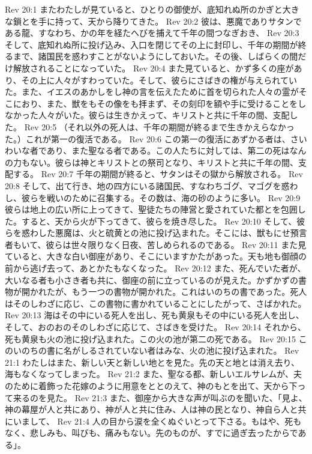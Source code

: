 Rev 20:1  またわたしが見ていると、ひとりの御使が、底知れぬ所のかぎと大きな鎖とを手に持って、天から降りてきた。
Rev 20:2  彼は、悪魔でありサタンである龍、すなわち、かの年を経たへびを捕えて千年の間つなぎおき、
Rev 20:3  そして、底知れぬ所に投げ込み、入口を閉じてその上に封印し、千年の期間が終るまで、諸国民を惑わすことがないようにしておいた。その後、しばらくの間だけ解放されることになっていた。
Rev 20:4  また見ていると、かず多くの座があり、その上に人々がすわっていた。そして、彼らにさばきの権が与えられていた。また、イエスのあかしをし神の言を伝えたために首を切られた人々の霊がそこにおり、また、獣をもその像をも拝まず、その刻印を額や手に受けることをしなかった人々がいた。彼らは生きかえって、キリストと共に千年の間、支配した。
Rev 20:5  （それ以外の死人は、千年の期間が終るまで生きかえらなかった。）これが第一の復活である。
Rev 20:6  この第一の復活にあずかる者は、さいわいな者であり、また聖なる者である。この人たちに対しては、第二の死はなんの力もない。彼らは神とキリストとの祭司となり、キリストと共に千年の間、支配する。
Rev 20:7  千年の期間が終ると、サタンはその獄から解放される。
Rev 20:8  そして、出て行き、地の四方にいる諸国民、すなわちゴグ、マゴグを惑わし、彼らを戦いのために召集する。その数は、海の砂のように多い。
Rev 20:9  彼らは地上の広い所に上ってきて、聖徒たちの陣営と愛されていた都とを包囲した。すると、天から火が下ってきて、彼らを焼き尽した。
Rev 20:10  そして、彼らを惑わした悪魔は、火と硫黄との池に投げ込まれた。そこには、獣もにせ預言者もいて、彼らは世々限りなく日夜、苦しめられるのである。
Rev 20:11  また見ていると、大きな白い御座があり、そこにいますかたがあった。天も地も御顔の前から逃げ去って、あとかたもなくなった。
Rev 20:12  また、死んでいた者が、大いなる者も小さき者も共に、御座の前に立っているのが見えた。かずかずの書物が開かれたが、もう一つの書物が開かれた。これはいのちの書であった。死人はそのしわざに応じ、この書物に書かれていることにしたがって、さばかれた。
Rev 20:13  海はその中にいる死人を出し、死も黄泉もその中にいる死人を出し、そして、おのおのそのしわざに応じて、さばきを受けた。
Rev 20:14  それから、死も黄泉も火の池に投げ込まれた。この火の池が第二の死である。
Rev 20:15  このいのちの書に名がしるされていない者はみな、火の池に投げ込まれた。
Rev 21:1  わたしはまた、新しい天と新しい地とを見た。先の天と地とは消え去り、海もなくなってしまった。
Rev 21:2  また、聖なる都、新しいエルサレムが、夫のために着飾った花嫁のように用意をととのえて、神のもとを出て、天から下って来るのを見た。
Rev 21:3  また、御座から大きな声が叫ぶのを聞いた、「見よ、神の幕屋が人と共にあり、神が人と共に住み、人は神の民となり、神自ら人と共にいまして、
Rev 21:4  人の目から涙を全くぬぐいとって下さる。もはや、死もなく、悲しみも、叫びも、痛みもない。先のものが、すでに過ぎ去ったからである」。
